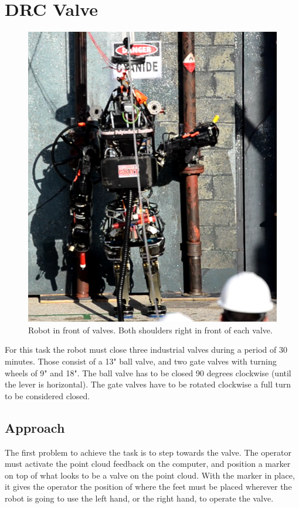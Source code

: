 \documentclass[12pt]{report}
\begin{document}
\section{DRC Valve}
\begin{figure}
  \begin{center}
    \includegraphics[scale=0.2]{images/turn_valve.png}
  \end{center}
  \caption{Robot in front of valves. Both shoulders right in front of each valve.}
\end{figure}
For this task the robot must close three industrial valves during a period of 30 minutes. Those consist of a 13" ball valve, and two gate valves with turning wheels of 9" and 18". The ball valve has to be closed 90 degrees clockwise (until the lever is horizontal). The gate valves have to be rotated clockwise a full turn to be considered closed.  \cite{valvetask}

\subsection{Approach}
The first problem to achieve the task is to step towards the valve. The operator must activate the point cloud feedback on the computer, and position a marker on top of what looks to be a valve on the point cloud. With the marker in place, it gives the operator the position of where the feet must be placed wherever the robot is going to use the left hand, or the right hand, to operate the valve. 
\end{document}
